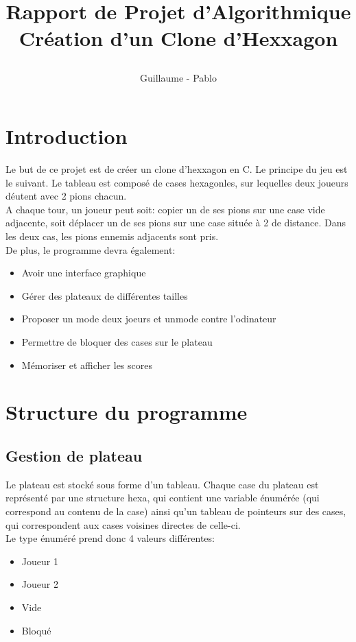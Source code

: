 \documentclass{report}
\begin{document}
\title{%
    \begin{minipage}\linewidth
        \centering
        Rapport de Projet d'Algorithmique
        \vskip 3pt
        \large Création d'un Clone d'Hexxagon
    \end{minipage}
}
\author{Guillaume  - Pablo }
\maketitle

\section{Introduction}

Le but de ce projet est de créer un clone d'hexxagon en C. Le principe du jeu est le suivant. Le tableau est composé de cases hexagonles, sur lequelles deux joueurs déutent avec 2 pions chacun.\\

A chaque tour, un joueur peut soit: copier un de ses pions sur une case vide adjacente, soit déplacer un de ses pions sur une case située à 2 de distance. Dans les deux cas, les pions ennemis adjacents sont pris.\\

De plus, le programme devra également: \begin{itemize}
\item Avoir une interface graphique
\item Gérer des plateaux de différentes tailles
\item Proposer un mode deux joeurs et unmode contre l'odinateur
\item Permettre de bloquer des cases sur le plateau 
\item Mémoriser et afficher les scores
\end {itemize}
\newpage
	
\section{Structure du programme}

	\subsection{Gestion de plateau}
		Le plateau est stocké sous forme d'un tableau.
		Chaque case du plateau est représenté par une structure hexa, qui contient une variable énumérée (qui correspond au contenu de la case) ainsi qu'un tableau de pointeurs sur des cases, qui correspondent aux cases voisines directes de celle-ci.\\
		Le type énuméré prend donc 4 valeurs différentes: 	\begin{itemize}
									\item Joueur 1
								  	\item Joueur 2
								  	\item Vide
								  	\item Bloqué
								  	\end{itemize}
	
\end{document}
